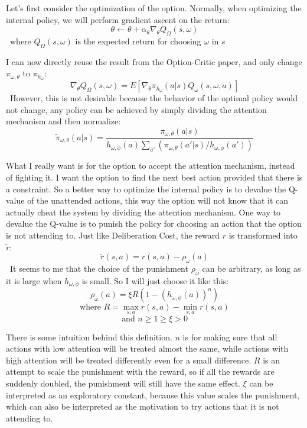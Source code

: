 \documentclass{article}
\begin{document}
	\quad Let's first consider the optimization of the option. Normally, when optimizing the internal policy, we will perform gradient ascent on the return: $$\theta \leftarrow \theta + \alpha_\theta \nabla_\theta Q_\Omega(s,\omega)$$ \qquad \ where $Q_\Omega(s,\omega)$ is the expected return for choosing $\omega$ in $s$
	
	\quad I can now directly reuse the result from the Option-Critic paper, and only change $\pi_{\omega,\theta}$ to $\pi_{h_\omega}$: $$\nabla_\theta Q_\Omega(s,\omega) = E[\nabla_\theta \pi_{h_\omega}(a|s) Q_\omega(s,\omega,a)]$$
	\qquad \ However, this is not desirable because the behavior of the optimal policy would not change, any policy can be achieved by simply dividing the attention mechanism and then normalize: $$\widetilde{\pi}_{\omega,\theta}(a|s) = \frac{\pi_{\omega,\theta}(a|s) }{h_{\omega, \phi}(a)\sum_{a'} (\pi_{\omega,\theta}(a'|s)/h_{\omega, \phi}(a'))}$$
	
	\quad What I really want is for the option to accept the attention mechanism, instead of fighting it. I want the option to find the next best action provided that there is a constraint. So a better way to optimize the internal policy is to devalue the Q-value of the unattended actions, this way the option will not know that it can actually cheat the system by dividing the attention mechanism. One way to devalue the Q-value is to punish the policy for choosing an action that the option is not attending to. Just like Deliberation Cost, the reward $r$ is transformed into $\widetilde{r}$: $$\widetilde{r}(s,a)=r(s,a)-\rho_\omega(a)$$ \qquad \ It seems to me that the choice of the punishment $\rho_\omega$ can be arbitrary, as long as it is large when $h_{\omega,\phi}$ is small. So I will just choose it like this:$$\rho_\omega(a)=\xi R (1-(h_{\omega,\phi}(a))^n)$$ $$\textrm{where } R=\max_{s,a}r(s,a)-\min_{s,a}r(s,a)$$ $$ \textrm{and } n\geq 1\geq\xi>0$$
	
	\quad There is some intuition behind this definition. $n$ is for making sure that all actions with low attention will be treated almost the same, while actions with high attention will be treated differently even for a small difference. $R$ is an attempt to scale the punishment with the reward, so if all the rewards are suddenly doubled, the punishment will still have the same effect. $\xi$ can be interpreted as an exploratory constant, because this value scales the punishment, which can also be interpreted as the motivation to try actions that it is not attending to.
	
\end{document}
